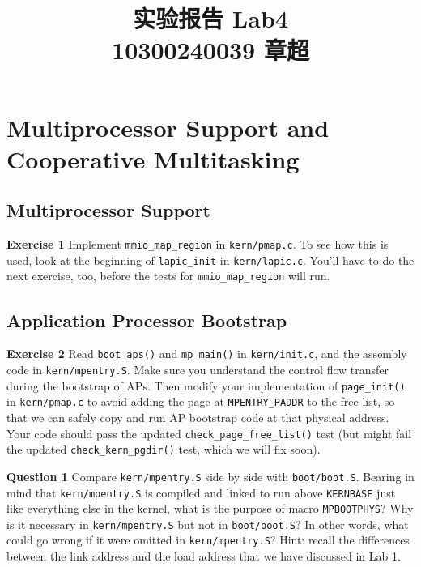 \documentclass[11pt]{article}
\begin{document}
\title{\textbf{\huge{实验报告 Lab4}}\\
10300240039 章超}
\maketitle
\section{Multiprocessor Support and Cooperative Multitasking}

\subsection{Multiprocessor Support}

\begin{framed}
\noindent\textbf{Exercise 1} Implement \lstinline|mmio_map_region| in \lstinline|kern/pmap.c|. To see how this is used, look at the beginning of \lstinline|lapic_init| in \lstinline|kern/lapic.c|. You'll have to do the next exercise, too, before the tests for \lstinline|mmio_map_region| will run.
\end{framed}

\subsection{Application Processor Bootstrap}
\begin{framed}
\noindent\textbf{Exercise 2} Read \lstinline|boot_aps()| and \lstinline|mp_main()| in \lstinline|kern/init.c|, and the assembly code in \lstinline|kern/mpentry.S|. Make sure you understand the control flow transfer during the bootstrap of APs. Then modify your implementation of \lstinline|page_init()| in \lstinline|kern/pmap.c| to avoid adding the page at \lstinline|MPENTRY_PADDR| to the free list, so that we can safely copy and run AP bootstrap code at that physical address. Your code should pass the updated \lstinline|check_page_free_list()| test (but might fail the updated \lstinline|check_kern_pgdir()| test, which we will fix soon).
\end{framed}

\begin{framed}
\noindent\textbf{Question 1} Compare \lstinline|kern/mpentry.S| side by side with \lstinline|boot/boot.S|. Bearing in mind that \lstinline|kern/mpentry.S| is compiled and linked to run above \lstinline|KERNBASE| just like everything else in the kernel, what is the purpose of macro \lstinline|MPBOOTPHYS|? Why is it necessary in \lstinline|kern/mpentry.S| but not in \lstinline|boot/boot.S|? In other words, what could go wrong if it were omitted in \lstinline|kern/mpentry.S|? 
Hint: recall the differences between the link address and the load address that we have discussed in Lab 1.
\end{framed}
\end{document}
